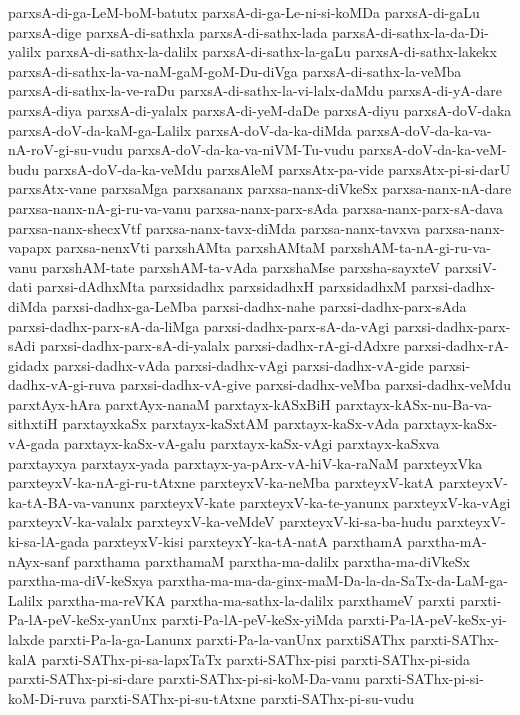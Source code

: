 {parxsA-di-ga-LeM-boM-batutx
parxsA-di-ga-Le-ni-si-koMDa
parxsA-di-gaLu
parxsA-dige
parxsA-di-sathxla
parxsA-di-sathx-lada
parxsA-di-sathx-la-da-Di-yalilx
parxsA-di-sathx-la-dalilx
parxsA-di-sathx-la-gaLu
parxsA-di-sathx-lakekx
parxsA-di-sathx-la-va-naM-gaM-goM-Du-diVga
parxsA-di-sathx-la-veMba
parxsA-di-sathx-la-ve-raDu
parxsA-di-sathx-la-vi-lalx-daMdu
parxsA-di-yA-dare
parxsA-diya
parxsA-di-yalalx
parxsA-di-yeM-daDe
parxsA-diyu
parxsA-doV-daka
parxsA-doV-da-kaM-ga-Lalilx
parxsA-doV-da-ka-diMda
parxsA-doV-da-ka-va-nA-roV-gi-su-vudu
parxsA-doV-da-ka-va-niVM-Tu-vudu
parxsA-doV-da-ka-veM-budu
parxsA-doV-da-ka-veMdu
parxsAleM
parxsAtx-pa-vide
parxsAtx-pi-si-darU
parxsAtx-vane
parxsaMga
parxsananx
parxsa-nanx-diVkeSx
parxsa-nanx-nA-dare
parxsa-nanx-nA-gi-ru-va-vanu
parxsa-nanx-parx-sAda
parxsa-nanx-parx-sA-dava
parxsa-nanx-shecxVtf
parxsa-nanx-tavx-diMda
parxsa-nanx-tavxva
parxsa-nanx-vapapx
parxsa-nenxVti
parxshAMta
parxshAMtaM
parxshAM-ta-nA-gi-ru-va-vanu
parxshAM-tate
parxshAM-ta-vAda
parxshaMse
parxsha-sayxteV
parxsiV-dati
parxsi-dAdhxMta
parxsidadhx
parxsidadhxH
parxsidadhxM
parxsi-dadhx-diMda
parxsi-dadhx-ga-LeMba
parxsi-dadhx-nahe
parxsi-dadhx-parx-sAda
parxsi-dadhx-parx-sA-da-liMga
parxsi-dadhx-parx-sA-da-vAgi
parxsi-dadhx-parx-sAdi
parxsi-dadhx-parx-sA-di-yalalx
parxsi-dadhx-rA-gi-dAdxre
parxsi-dadhx-rA-gidadx
parxsi-dadhx-vAda
parxsi-dadhx-vAgi
parxsi-dadhx-vA-gide
parxsi-dadhx-vA-gi-ruva
parxsi-dadhx-vA-give
parxsi-dadhx-veMba
parxsi-dadhx-veMdu
parxtAyx-hAra
parxtAyx-nanaM
parxtayx-kASxBiH
parxtayx-kASx-nu-Ba-va-sithxtiH
parxtayxkaSx
parxtayx-kaSxtAM
parxtayx-kaSx-vAda
parxtayx-kaSx-vA-gada
parxtayx-kaSx-vA-galu
parxtayx-kaSx-vAgi
parxtayx-kaSxva
parxtayxya
parxtayx-yada
parxtayx-ya-pArx-vA-hiV-ka-raNaM
parxteyxVka
parxteyxV-ka-nA-gi-ru-tAtxne
parxteyxV-ka-neMba
parxteyxV-katA
parxteyxV-ka-tA-BA-va-vanunx
parxteyxV-kate
parxteyxV-ka-te-yanunx
parxteyxV-ka-vAgi
parxteyxV-ka-valalx
parxteyxV-ka-veMdeV
parxteyxV-ki-sa-ba-hudu
parxteyxV-ki-sa-lA-gada
parxteyxV-kisi
parxteyxY-ka-tA-natA
parxthamA
parxtha-mA-nAyx-sanf
parxthama
parxthamaM
parxtha-ma-dalilx
parxtha-ma-diVkeSx
parxtha-ma-diV-keSxya
parxtha-ma-ma-da-ginx-maM-Da-la-da-SaTx-da-LaM-ga-Lalilx
parxtha-ma-reVKA
parxtha-ma-sathx-la-dalilx
parxthameV
parxti
parxti-Pa-lA-peV-keSx-yanUnx
parxti-Pa-lA-peV-keSx-yiMda
parxti-Pa-lA-peV-keSx-yi-lalxde
parxti-Pa-la-ga-Lanunx
parxti-Pa-la-vanUnx
parxtiSAThx
parxti-SAThx-kalA
parxti-SAThx-pi-sa-lapxTaTx
parxti-SAThx-pisi
parxti-SAThx-pi-sida
parxti-SAThx-pi-si-dare
parxti-SAThx-pi-si-koM-Da-vanu
parxti-SAThx-pi-si-koM-Di-ruva
parxti-SAThx-pi-su-tAtxne
parxti-SAThx-pi-su-vudu
}
